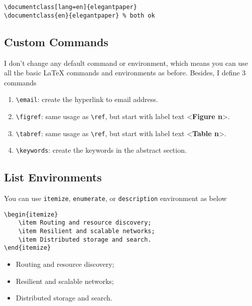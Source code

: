 \documentclass[11pt]{elegantpaper}
\begin{document}
\begin{lstlisting}
\documentclass[lang=en]{elegantpaper}
\documentclass{en}{elegantpaper} % both ok
\end{lstlisting}

\subsection{Custom Commands}

I don't change any default command or environment, which means you can use all the basic \LaTeX{} commands and environments as before.  Besides, I define 3 commands
\begin{enumerate}
	\item \lstinline{\email}: create the hyperlink to email address.
	\item \lstinline{\figref}: same usage as \lstinline{\ref}, but start with label text <\textbf{Figure n}>.
	\item \lstinline{\tabref}: same usage as \lstinline{\ref}, but start with label text <\textbf{Table n}>.
	\item \lstinline{\keywords}: create the keywords in the abstract section.
\end{enumerate}{}

\subsection{List Environments}
You can use \lstinline{itemize}, \lstinline{enumerate}, or \lstinline{description} environment as below\\
\begin{minipage}[c]{0.51\linewidth}
\begin{lstlisting}
\begin{itemize}
    \item Routing and resource discovery;
    \item Resilient and scalable networks;
    \item Distributed storage and search.
\end{itemize}
\end{lstlisting}
\end{minipage}
\begin{minipage}[c]{0.48\linewidth}
\begin{itemize}
    \item Routing and resource discovery;
    \item Resilient and scalable networks;
    \item Distributed storage and search.
\end{itemize}
\end{minipage}
\end{document}
